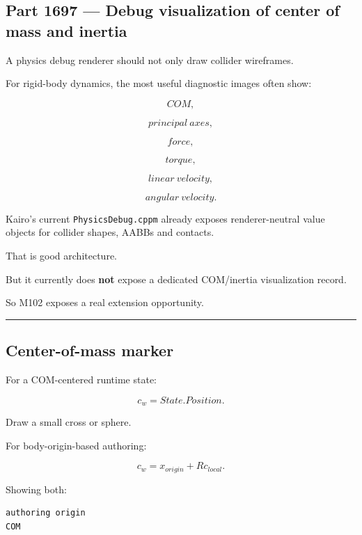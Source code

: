 \subsection{Part 1697 --- Debug visualization of center of mass and inertia}\label{06-engine-ii-ch039-part-1697-debug-visualization-of-center-of-mass-and-inertia}

\hypertarget{06-engine-ii-ch039-part-1697-debug-visualization-of-center-of-mass-and-inertia}{}

A physics debug renderer should not only draw collider wireframes.

For rigid-body dynamics, the most useful diagnostic images often show:

\[
COM,
\]

\[
principal\ axes,
\]

\[
force,
\]

\[
torque,
\]

\[
linear\ velocity,
\]

\[
angular\ velocity.
\]

Kairo's current \texttt{PhysicsDebug.cppm} already exposes renderer-neutral value objects for collider shapes, AABBs and contacts.

That is good architecture.

But it currently does \textbf{not} expose a dedicated COM/inertia visualization record.

So M102 exposes a real extension opportunity.

\begin{center}\rule{0.5\linewidth}{0.5pt}\end{center}

\subsection{Center-of-mass marker}\label{06-engine-ii-ch039-center-of-mass-marker}

\hypertarget{06-engine-ii-ch039-center-of-mass-marker}{}

For a COM-centered runtime state:

\[
c_w=
State.Position.
\]

Draw a small cross or sphere.

For body-origin-based authoring:

\[
c_w
=
x_{origin}
+
R c_{local}.
\]

Showing both:

\begin{verbatim}
authoring origin
COM
\end{verbatim}

